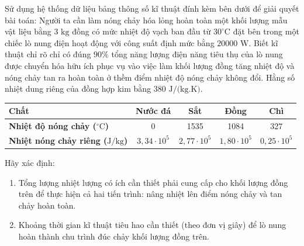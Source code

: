 \begin{ex}%
	Sử dụng hệ thống dữ liệu bảng thông số kĩ thuật đính kèm bên dưới để giải quyết bài toán: Người ta cần làm nóng chảy hóa lỏng hoàn toàn một khối lượng mẫu vật liệu bằng $3\text{ kg}$ đồng có mức nhiệt độ vạch ban đầu từ $30^\circ\text{C}$ đặt bên trong một chiếc lò nung điện hoạt động với công suất định mức bằng $20000\text{ W}$. Biết kĩ thuật chỉ rõ chỉ có đúng $90\%$ tổng năng lượng điện năng tiêu thụ của lò nung được chuyển hóa hữu ích phục vụ vào việc làm khối lượng đồng tăng nhiệt độ và nóng chảy tan ra hoàn toàn ở thềm điểm nhiệt độ nóng chảy không đổi. Hằng số nhiệt dung riêng của đồng hợp kim bằng $380\text{ J/(kg.K)}$.
	\begin{center}
		\begin{tabular}{|l|c|c|c|c|}
			\hline
			\textbf{Chất} & \textbf{Nước đá} & \textbf{Sắt} & \textbf{Đồng} & \textbf{Chì} \\ \hline
			\textbf{Nhiệt độ nóng chảy ($^\circ\text{C}$)} & 0 & 1535 & 1084 & 327 \\ \hline
			\textbf{Nhiệt nóng chảy riêng ($\text{J/kg}$)} & $3,34 \cdot 10^5$ & $2,77 \cdot 10^5$ & $1,80 \cdot 10^5$ & $0,25 \cdot 10^5$ \\ \hline
		\end{tabular}
	\end{center}
	Hãy xác định:
	\begin{enumerate}
		\item[a)] Tổng lượng nhiệt lượng có ích cần thiết phải cung cấp cho khối lượng đồng trên để thực hiện cả hai tiến trình: nâng nhiệt lên điểm nóng chảy và tan chảy hoàn toàn.
		\item[b)] Khoảng thời gian kĩ thuật tiêu hao cần thiết (theo đơn vị giây) để lò nung hoàn thành chu trình đúc chảy khối lượng đồng trên.
	\end{enumerate}
\end{ex}
